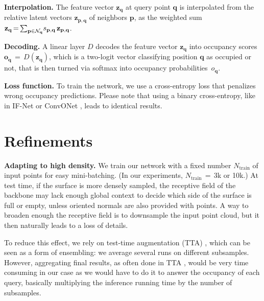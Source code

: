 \documentclass[10pt,twocolumn,letterpaper]{article}
\newcommand{\decoder}{D}
\newcommand{\latentv}{{\mathbf{z}}}
\newcommand{\neighbors}{{\mathcal{N}}}
\newcommand{\occupancy}{\mathbf{o}}
\newcommand{\occupancyp}{{o}}
\newcommand{\point}{{\mathbf{p}}}
\newcommand{\qpoint}{{\mathbf{q}}}
\newcommand{\significance}{s}
\newcommand{\Ntrain}{N_{\text{train}}}
\begin{document}
\textbf{Interpolation.} The feature vector 
$\latentv_\qpoint$ at query point $\qpoint$ is interpolated from the relative latent vectors $\latentv_{\point,\qpoint}$ of neighbors $\point$, as the weighted sum $\latentv_\qpoint \,{=} \sum_{\point \in \smash{\neighbors_\qpoint}} \!\significance_{\point,\qpoint} \,\latentv_{\point,\qpoint}$.

\textbf{Decoding.} A linear layer $\decoder$ decodes the feature vector 
$\latentv_{\qpoint}$ into occupancy scores $\occupancy_{\qpoint} \,{=}\, \decoder(\latentv_{\qpoint})$, which is a two-logit vector classifying position $\qpoint$ as occupied or not, that is then turned via softmax into occupancy probabilities~$\occupancyp_{\qpoint}$.

\textbf{Loss function.} To train the network, we use a cross-entropy loss that penalizes wrong occupancy predictions. Please note that using a binary cross-entropy, like in IF-Net \cite{Chibane2020CVPR} or ConvONet \cite{Peng2020ECCV}, leads to identical 
results.




















\section{Refinements}

\textbf{Adapting to high density.}
We train our network with a fixed number $\Ntrain$ of input points for easy mini-batching. (In our experiments, $\Ntrain \,{=}\,$3k  or  10k.) 
At test time, if the surface is more densely sampled, the receptive field of the backbone may lack enough global context to decide which side of the surface is full or empty, unless oriented normals are also provided with points. 
A way to broaden enough the receptive field is to downsample the input point cloud, but it then naturally leads to a loss of details.

To reduce this effect, we rely on test-time augmentation (TTA) \cite{krizhevsky2012imagenet}, which can be seen as a form of ensembling: we average several runs on different subsamples.
However, aggregating final results, as often done in TTA \cite{Shanmugam2021BetterAggregation}, would be very time consuming in our case as we would have to do it to answer the occupancy of each query, basically multiplying the inference running time by the number of subsamples.
\end{document}
